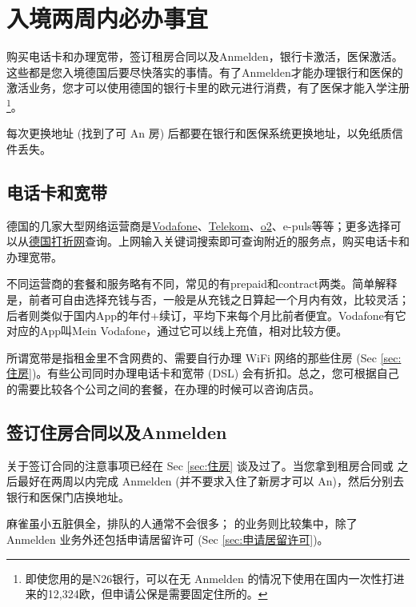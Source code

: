 \section{入境两周内必办事宜}\label{sec:入境两周内必办事宜}

  购买电话卡和办理宽带，签订租房合同以及Anmelden，银行卡激活，医保激活。这些都是您入境德国后要尽快落实的事情。有了Anmelden才能办理银行和医保的激活业务，您才可以使用德国的银行卡里的欧元进行消费，有了医保才能入学注册\footnote{即使您用的是N26银行，可以在无 Anmelden 的情况下使用在国内一次性打进来的12,324欧，但申请公保是需要固定住所的。}。

  每次更换地址 (找到了可 An 房) 后都要在银行和医保系统更换地址，以免纸质信件丢失。

  \subsection{电话卡和宽带}\label{subsec:电话卡和宽带}

    德国的几家大型网络运营商是\href{https://www.vodafone-shops.de/aachen-203344151/}{Vodafone}、\href{https://shopseite.telekom.de/west/aachen/holzgraben-6}{Telekom}、\href{https://www.o2online.de/shops/aachen/3}{o2}、e-puls等等；更多选择可以从\href{https://www.dazhe.de/}{德国打折网}查询。上网输入关键词搜索即可查询附近的服务点，购买电话卡和办理宽带。

    不同运营商的套餐和服务略有不同，常见的有prepaid和contract两类。简单解释是，前者可自由选择充钱与否，一般是从充钱之日算起一个月内有效，比较灵活；后者则类似于国内App的年付+续订，平均下来每个月比前者便宜。Vodafone有它对应的App叫Mein Vodafone，通过它可以线上充值，相对比较方便。

    所谓宽带是指租金里不含网费的、需要自行办理 WiFi 网络的那些住房 (Sec \ref{sec:住房})。有些公司同时办理电话卡和宽带 (DSL) 会有折扣。总之，您可根据自己的需要比较各个公司之间的套餐，在办理的时候可以咨询店员。

  \subsection{签订住房合同以及Anmelden}\label{subsec:签订住房合同以及Anmelden}

    关于签订合同的注意事项已经在 Sec \ref{sec:住房} 谈及过了。当您拿到租房合同或 之后最好在两周以内完成 Anmelden (并不要求入住了新房才可以 An)，然后分别去银行和医保门店换地址。

     麻雀虽小五脏俱全，排队的人通常不会很多； 的业务则比较集中，除了 Anmelden 业务外还包括申请居留许可 (Sec \ref{sec:申请居留许可})。

